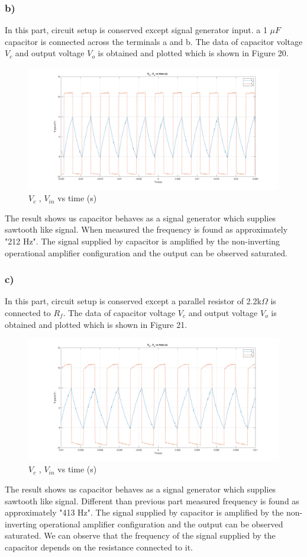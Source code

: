 \documentclass[letterpaper,12pt]{article}
\begin{document}
\subsubsection{b)}
In this part, circuit setup is conserved except signal generator input. a 1 \(\mu F\) capacitor is connected across the terminals a and b.  
The data of capacitor voltage \(V_c\) and output voltage \(V_o\) is obtained and plotted which is shown in Figure 20. 
\begin{figure}[H]
	\centering
   \includegraphics[width=1\textwidth]{3b_1_new.png}
   \caption{\(V_{c}\) , \(V_{in}\) vs time (s) }
\end{figure}
The result shows us capacitor behaves as a signal generator which supplies sawtooth like signal. When measured the frequency is found as approximately "212 Hz". The signal supplied by capacitor is amplified by the non-inverting operational amplifier configuration and the output can be observed saturated. 
\subsubsection{c)}

In this part, circuit setup is conserved except a parallel resistor of 2.2k\(\Omega\) is connected to \(R_f\). 
The data of capacitor voltage \(V_c\) and output voltage \(V_o\) is obtained and plotted which is shown in Figure 21. 
\begin{figure}[H]
	\centering
   \includegraphics[width=1\textwidth]{3c_1_new.png}
   \caption{\(V_{c}\) , \(V_{in}\) vs time (s) }
\end{figure}
The result shows us capacitor behaves as a signal generator which supplies sawtooth like signal. Different than previous part measured frequency is found as approximately "413 Hz". The signal supplied by capacitor is amplified by the non-inverting operational amplifier configuration and the output can be observed saturated. We can observe that the frequency of the signal supplied by the capacitor depends on the resistance connected to it. 
\end{document}
